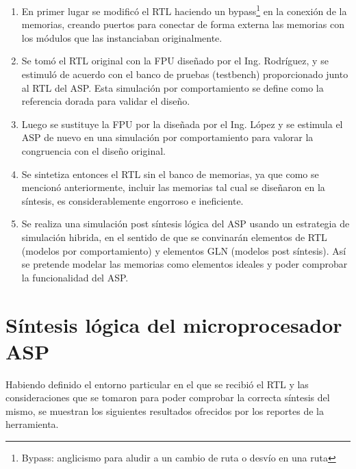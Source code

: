 \begin{enumerate}

\item En primer lugar se modificó el RTL haciendo un bypass\footnote{Bypass: anglicismo para aludir a un cambio de ruta o desvío en una ruta} en la conexión de la memorias, creando puertos para conectar de forma externa las memorias con los módulos que las instanciaban originalmente.

\item Se tomó el RTL original con la FPU diseñado por el Ing. Rodríguez, y se estimuló de acuerdo con el banco de pruebas (testbench) proporcionado junto al RTL del ASP. Esta simulación por comportamiento se define como la referencia dorada para validar el diseño.

\item Luego se sustituye la FPU por la diseñada por el Ing. López y se estimula el ASP de nuevo en una simulación por comportamiento para valorar la congruencia con el diseño original.

\item Se sintetiza entonces el RTL sin el banco de memorias, ya que como se mencionó anteriormente, incluir las memorias tal cual se diseñaron en la síntesis, es considerablemente engorroso e ineficiente.

\item Se realiza una simulación post síntesis lógica del ASP usando un estrategia de simulación hibrida, en el sentido de que se convinarán elementos de RTL (modelos por comportamiento) y elementos GLN (modelos post síntesis). Así se pretende modelar las memorias como elementos ideales y poder comprobar la funcionalidad del ASP.
\end{enumerate}

\section{Síntesis lógica del microprocesador ASP}

Habiendo definido el entorno particular en el que se recibió el RTL y las consideraciones que se tomaron para poder comprobar la correcta síntesis del mismo, se muestran los siguientes resultados ofrecidos por los reportes de la herramienta.

